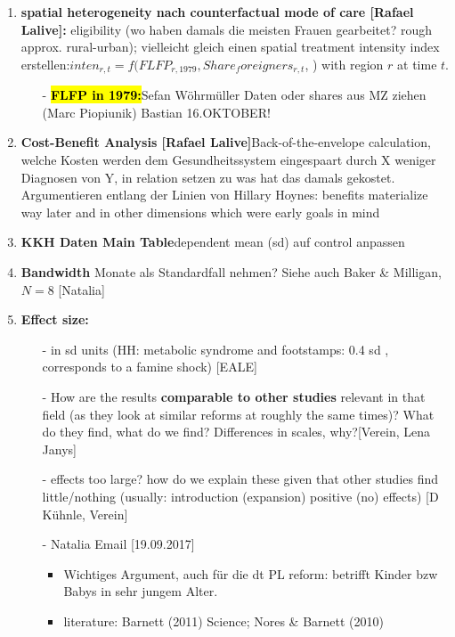 \documentclass[11pt,a4paper]{article}
\begin{document}
{\begin{enumerate}
\item  \textbf{spatial heterogeneity nach counterfactual mode of care [Rafael Lalive]:} \newline eligibility (wo haben damals die meisten Frauen gearbeitet? rough approx. rural-urban); vielleicht gleich einen spatial treatment intensity index erstellen:\newline $inten_{r,t}=f(FLFP_{r,1979}, Share_foreigners_{r,t}$, ) \newline
with region $r$ at time $t$. 
\begin{itemize}
\item[-] \textbf{\hl{FLFP in 1979:}}\newline Sefan Wöhrmüller Daten oder shares aus MZ ziehen (Marc Piopiunik) Bastian 16.OKTOBER!
\end{itemize}


\item \textbf{Cost-Benefit Analysis [Rafael Lalive]}\newline Back-of-the-envelope calculation, welche Kosten werden dem Gesundheitssystem eingespaart durch X weniger Diagnosen von Y, in relation setzen zu was hat das damals gekostet. Argumentieren entlang der Linien von Hillary Hoynes: benefits materialize way later and in other dimensions which were early goals in mind


\item \textbf{KKH Daten Main Table}\newline dependent mean (sd) auf control anpassen


\item \textbf{Bandwidth} Monate als Standardfall nehmen? \newline
Siehe auch Baker \& Milligan, $N=8$ [Natalia]


\item \textbf{Effect size:}\vspace{-1em}
\begin{itemize}
\item[-]in sd units (HH: metabolic syndrome and footstamps: 0.4 sd , corresponds to a famine shock) [EALE]
\item[-] How are the results \textbf{comparable to other studies} relevant in that field (as they look at similar reforms at roughly the same times)? What do they find, what do we find? Differences in scales, why?[Verein, Lena Janys]
\item[-] effects too large? how do we explain these given that other studies find little/nothing (usually: introduction (expansion) positive (no) effects) [D Kühnle, Verein]
\item[-] Natalia Email [19.09.2017]\vspace{-0.5em}
\begin{itemize}
\item Wichtiges Argument, auch für die dt PL reform: betrifft Kinder bzw Babys in sehr jungem Alter.
\item literature: Barnett (2011) Science; Nores \& Barnett (2010) 
\end{itemize}
\end{itemize}



\end{enumerate}}
\end{document}
